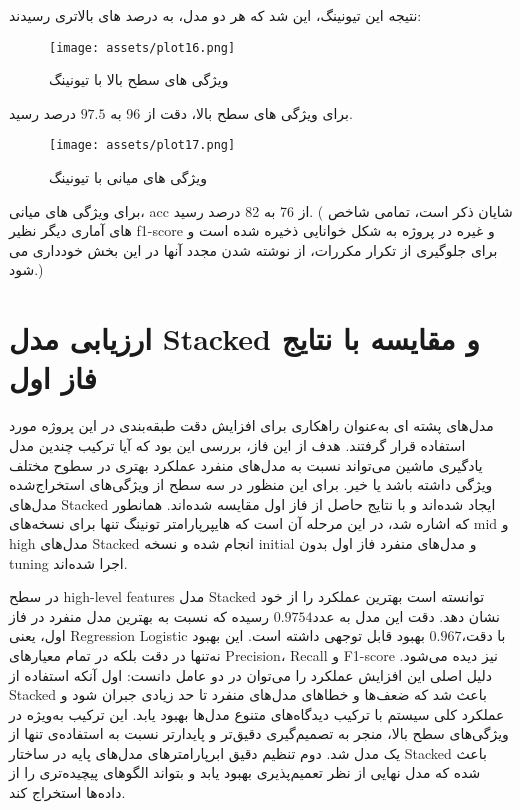 \documentclass[a4paper,12pt]{article}
\begin{document}
\pagebreak
نتیجه این تیونینگ، این شد که هر دو مدل، به درصد های بالاتری رسیدند:

\begin{figure}[h]
	\centering
	\texttt{[image: assets/plot16.png]}
	\caption{\textcolor{CustomAccent}{ویژگی های سطح بالا با تیونینگ}}
\end{figure}
برای ویژگی های سطح بالا، دقت از 96 به $97.5$ درصد رسید.

\begin{figure}[h]
	\centering
	\texttt{[image: assets/plot17.png]}
	\caption{\textcolor{CustomAccent}{ ویژگی های میانی با تیونینگ}}
\end{figure}
برای ویژگی های میانی، acc از 76 به 82 درصد رسید.
(
شایان ذکر است، تمامی شاخص های آماری دیگر نظیر f1-score و غیره در پروژه به شکل خوانایی ذخیره شده است و برای جلوگیری از تکرار مکررات، از نوشته شدن مجدد آنها در این بخش خودداری می شود.)

\pagebreak

\section*{ارزیابی مدل Stacked و مقایسه با نتایج فاز اول}

مدل‌های پشته ای
 به‌عنوان راهکاری برای افزایش دقت طبقه‌بندی در این پروژه مورد استفاده قرار گرفتند. هدف از این فاز، بررسی این بود که آیا ترکیب چندین مدل یادگیری ماشین می‌تواند نسبت به مدل‌های منفرد عملکرد بهتری در سطوح مختلف ویژگی داشته باشد یا خیر. برای این منظور در سه سطح از ویژگی‌های استخراج‌شده مدل‌های Stacked ایجاد شده‌اند و با نتایج حاصل از فاز اول مقایسه شده‌اند. همانطور که اشاره شد، در این مرحله آن است که هایپرپارامتر تونینگ تنها برای نسخه‌های mid و high مدل‌های Stacked انجام شده و نسخه initial و مدل‌های منفرد فاز اول بدون tuning اجرا شده‌اند.
 
 
در سطح high-level features مدل Stacked توانسته است بهترین عملکرد را از خود نشان دهد. دقت این مدل به عدد$ 0.9754$ رسیده که نسبت به بهترین مدل منفرد در فاز اول، یعنی 
 Regression 
 Logistic
 با دقت$ 0.967،$ بهبود قابل توجهی داشته است. این بهبود نه‌تنها در دقت بلکه در تمام معیارهای Precision، Recall و F1-score نیز دیده می‌شود. دلیل اصلی این افزایش عملکرد را می‌توان در دو عامل دانست: اول آنکه استفاده از Stacked باعث شد که ضعف‌ها و خطاهای مدل‌های منفرد تا حد زیادی جبران شود و عملکرد کلی سیستم با ترکیب دیدگاه‌های متنوع مدل‌ها بهبود یابد. این ترکیب به‌ویژه در ویژگی‌های سطح بالا، منجر به تصمیم‌گیری دقیق‌تر و پایدارتر نسبت به استفاده‌ی تنها از یک مدل شد. دوم تنظیم دقیق ابرپارامترهای مدل‌های پایه در ساختار Stacked باعث شده که مدل نهایی از نظر تعمیم‌پذیری بهبود یابد و بتواند الگوهای پیچیده‌تری را از داده‌ها استخراج کند.
 
\end{document}
